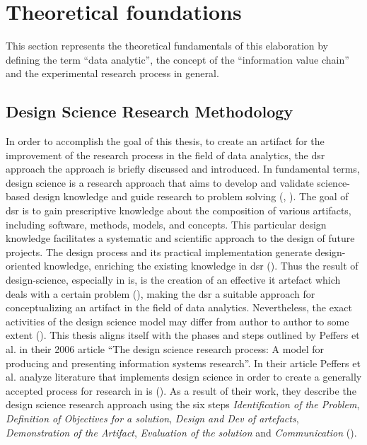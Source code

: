 \section{Theoretical foundations}

This section represents the theoretical fundamentals of this elaboration by defining the term \enquote{data analytic}, the concept of the \enquote{information value chain} and the experimental research process in general.


\subsection{Design Science Research Methodology}

In order to accomplish the goal of this thesis, to create an artifact for the improvement of the research process in the field of data analytics, the \ac{dsr} approach the approach is briefly discussed and introduced. In fundamental terms, design science is a research approach that aims to develop and validate science-based design knowledge and guide research to problem solving (\cite{Hevner.2004}, \cite{Dresch.2015}). The goal of \ac{dsr} is to gain prescriptive knowledge about the composition of various artifacts, including software, methods, models, and concepts. This particular design knowledge facilitates a systematic and scientific approach to the design of future projects. The design process and its practical implementation generate design-oriented knowledge, enriching the existing knowledge in \ac{dsr} (\cite{Hevner.2004}). Thus the result of design-science, especially in \ac{is}, is the creation of an effective \ac{it} artefact which deals with a certain problem (\cite{Hevner.2004}), making the \ac{dsr} a suitable approach for conceptualizing an artifact in the field of data analytics. Nevertheless, the exact activities of the design science model may differ from author to author to some extent (\cite{Fulcher.1996}). This thesis aligns itself with the phases and steps outlined by Peffers et al. in their 2006 article \enquote{The design science research process: A model for producing and presenting information systems research}. In their article Peffers et al. analyze literature that implements design science in order to create a generally accepted process for research in \ac{is} (\cite{Peffers.2006}). As a result of their work, they describe the design science research approach using the six steps \textit{Identification of the Problem}, \textit{Definition of Objectives for a solution}, \textit{Design and Dev of artefacts}, \textit{Demonstration of the Artifact}, \textit{Evaluation of the solution} and \textit{Communication} (\cite{Peffers.2006}). 


